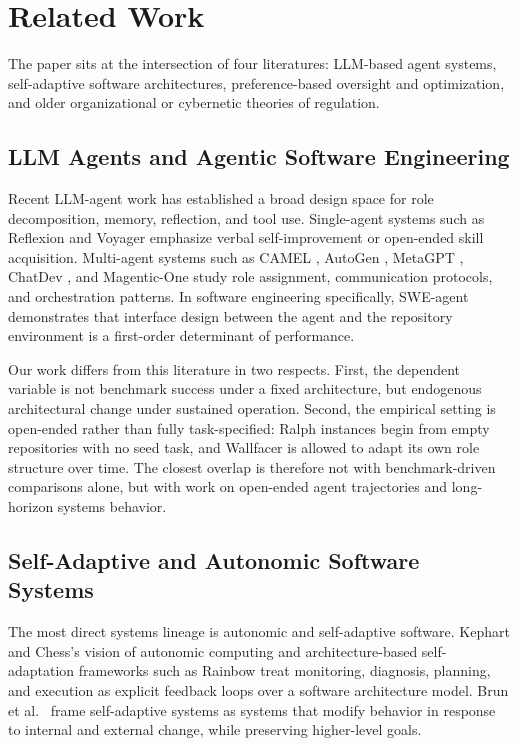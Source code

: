 \section{Related Work}

The paper sits at the intersection of four literatures: LLM-based agent systems, self-adaptive software architectures, preference-based oversight and optimization, and older organizational or cybernetic theories of regulation.

\subsection{LLM Agents and Agentic Software Engineering}

Recent LLM-agent work has established a broad design space for role decomposition, memory, reflection, and tool use. Single-agent systems such as Reflexion \cite{shinn2023reflexion} and Voyager \cite{wang2023voyager} emphasize verbal self-improvement or open-ended skill acquisition. Multi-agent systems such as CAMEL \cite{li2023camel}, AutoGen \cite{wu2024autogen}, MetaGPT \cite{hong2023metagpt}, ChatDev \cite{qian2024chatdev}, and Magentic-One \cite{fourney2024magenticone} study role assignment, communication protocols, and orchestration patterns. In software engineering specifically, SWE-agent \cite{yang2024sweagent} demonstrates that interface design between the agent and the repository environment is a first-order determinant of performance.

Our work differs from this literature in two respects. First, the dependent variable is not benchmark success under a fixed architecture, but endogenous architectural change under sustained operation. Second, the empirical setting is open-ended rather than fully task-specified: Ralph instances begin from empty repositories with no seed task, and Wallfacer is allowed to adapt its own role structure over time. The closest overlap is therefore not with benchmark-driven comparisons alone, but with work on open-ended agent trajectories and long-horizon systems behavior.

\subsection{Self-Adaptive and Autonomic Software Systems}

The most direct systems lineage is autonomic and self-adaptive software. Kephart and Chess's vision of autonomic computing \cite{kephart2003} and architecture-based self-adaptation frameworks such as Rainbow \cite{cheng2004rainbow} treat monitoring, diagnosis, planning, and execution as explicit feedback loops over a software architecture model. Brun et al.\ \cite{brun2009} frame self-adaptive systems as systems that modify behavior in response to internal and external change, while preserving higher-level goals.

